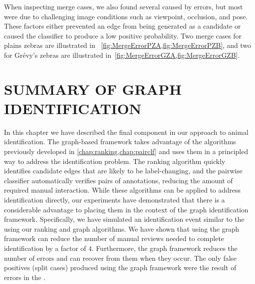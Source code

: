     When inspecting merge cases, we also found several caused by \groundtruth{} errors, but most were due to
      challenging image conditions such as viewpoint, occlusion, and pose.
    These factors either prevented an edge from being generated as a candidate or caused the classifier to
      produce a low positive probability.
    Two merge cases for plains zebras are illustrated in ~\cref{fig:MergeErrorPZA,fig:MergeErrorPZB}, and two for
      Grévy's zebras are illustrated in~\cref{fig:MergeErrorGZA,fig:MergeErrorGZB}.


    \SplitErrorsPZ{}

    \SplitErrorsGZ{}

    \MergeErrorPZA{}

    \MergeErrorPZB{}

    \MergeErrorGZA{}

    \MergeErrorGZB{}

 
\FloatBarrier{}
\section{SUMMARY OF GRAPH IDENTIFICATION}\label{sec:graphconclusion}

In this chapter we have described the final component in our approach to animal identification.
The graph-based framework takes advantage of the algorithms previously developed in
  \cref{chap:ranking,chap:pairclf} and uses them in a principled way to address the identification problem.
The ranking algorithm quickly identifies candidate edges that are likely to be label-changing, and the pairwise
  classifier automatically verifies pairs of annotations, reducing the amount of required manual interaction.
While these algorithms can be applied to address identification directly, our experiments have demonstrated that
  there is a considerable advantage to placing them in the context of the graph identification framework.
Specifically, we have simulated an identification event similar to the \GZC{} using our ranking and graph
  algorithms.
We have shown that using the graph framework can reduce the number of manual reviews needed to complete
  identification by a factor of $4$.
Furthermore, the graph framework reduces the number of errors and can recover from them when they occur.
The only false positives (split cases) produced using the graph framework were the result of errors in the
  \groundtruth{}.

